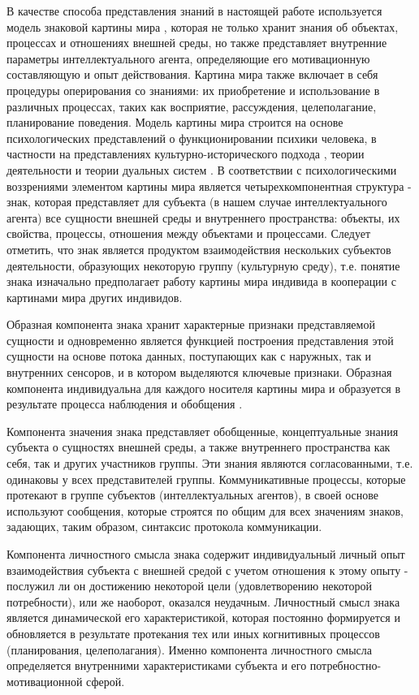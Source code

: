 \documentclass[12pt]{scrartcl}
\begin{document}
	В качестве способа представления знаний в настоящей работе используется модель знаковой картины мира \cite{Osipov2014c,Osipov2015b, Osipov2016}, которая не только хранит знания об объектах, процессах и отношениях внешней среды, но также представляет внутренние параметры интеллектуального агента, определяющие его мотивационную составляющую и опыт действования. Картина мира также включает в себя процедуры оперирования со знаниями: их приобретение и использование в различных процессах, таких как восприятие, рассуждения, целеполагание, планирование поведения\cite{Osipov2015d}. Модель картины мира строится на основе психологических представлений о функционировании психики человека, в частности на представлениях культурно-исторического подхода \cite{Vygotsky1999}, теории деятельности \cite{Leontiev1977,Chudova2012b} и теории дуальных систем \cite{Evans2013,Stanovich2009}. В соответствии с психологическими воззрениями элементом картины мира является четырехкомпонентная структура - знак, которая представляет для субъекта (в нашем случае интеллектуального агента) все сущности внешней среды и внутреннего пространства: объекты, их свойства, процессы, отношения между объектами и процессами. Следует отметить, что знак является продуктом взаимодействия нескольких субъектов деятельности, образующих некоторую группу (культурную среду), т.е. понятие знака изначально предполагает работу картины мира индивида в кооперации с картинами мира других индивидов.
	
	Образная компонента знака хранит характерные признаки представляемой сущности и одновременно является функцией построения представления этой сущности на основе потока данных, поступающих как с наружных, так и внутренних сенсоров, и в котором выделяются ключевые признаки. Образная компонента индивидуальна для каждого носителя картины мира и образуется в результате процесса наблюдения и обобщения \cite{Panov2014d,Panov2015c,Skrynnik2016}. 
	
	Компонента значения знака представляет обобщенные, концептуальные знания субъекта о сущностях внешней среды, а также внутреннего пространства как себя, так и других участников группы. Эти знания являются согласованными, т.е. одинаковы у всех представителей группы. Коммуникативные процессы, которые протекают в группе субъектов (интеллектуальных агентов), в своей основе используют сообщения, которые строятся по общим для всех значениям знаков, задающих, таким образом, синтаксис протокола коммуникации.
	
	Компонента личностного смысла знака содержит индивидуальный личный опыт взаимодействия субъекта с внешней средой с учетом отношения к этому опыту - послужил ли он достижению некоторой цели (удовлетворению некоторой потребности), или же наоборот, оказался неудачным. Личностный смысл знака является динамической его характеристикой, которая постоянно формируется и обновляется в результате протекания тех или иных когнитивных процессов (планирования, целеполагания). Именно компонента личностного смысла определяется внутренними характеристиками субъекта и его потребностно-мотивационной сферой.
	
\end{document}
